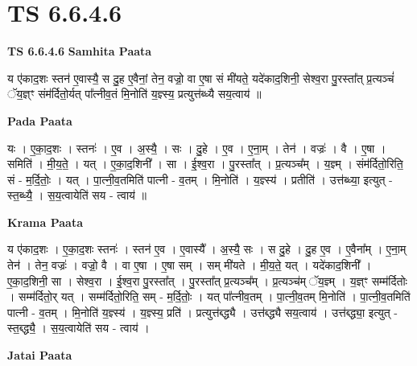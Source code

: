 \documentclass[17pt]{extarticle}
\begin{document}
\section{ TS 6.6.4.6 }

\textbf{TS 6.6.4.6 } \newline
\textbf{Samhita Paata} \newline

य ए॑काद॒शः स्तन॑ ए॒वास्यै॒ स दु॒ह ए॒वैनां॒ तेन॒ वज्रो॒ वा ए॒षा सं मी॑यते॒ यदे॑काद॒शिनी॒ सेश्व॒रा पु॒रस्ता᳚त् प्र॒त्यञ्चं॑ ॅय॒ज्ञ्ꣳ संम॑र्दितो॒र्यत् पा᳚त्नीव॒तं मि॒नोति॑ य॒ज्ञ्स्य॒ प्रत्युत्त॑ब्ध्यै सय॒त्वाय॑ ॥ \newline

\textbf{Pada Paata} \newline

यः । ए॒का॒द॒शः । स्तनः॑ । ए॒व । अ॒स्यै॒ । सः । दु॒हे । ए॒व । ए॒ना॒म् । तेन॑ । वज्रः॑ । वै । ए॒षा । समिति॑ । मी॒य॒ते॒ । यत् । ए॒का॒द॒शिनी᳚ । सा । ई॒श्व॒रा । पु॒रस्ता᳚त् । प्र॒त्यञ्च᳚म् । य॒ज्ञ्म् । संम॑र्दितो॒रिति॒ सं - म॒र्दि॒तोः॒ । यत् । पा॒त्नी॒व॒तमिति॑ पात्नी - व॒तम् । मि॒नोति॑ । य॒ज्ञ्स्य॑ । प्रतीति॑ । उत्त॑ब्ध्या॒ इत्युत् - स्त॒ब्ध्यै॒ । स॒य॒त्वायेति॑ सय - त्वाय॑ ॥  \newline


\textbf{Krama Paata} \newline

य ए॑काद॒शः । ए॒का॒द॒शः स्तनः॑ । स्तन॑ ए॒व । ए॒वास्यै᳚ । अ॒स्यै॒ सः । स दु॒हे । दु॒ह ए॒व । ए॒वैना᳚म् । ए॒ना॒म् तेन॑ । तेन॒ वज्रः॑ । वज्रो॒ वै । वा ए॒षा । ए॒षा सम् । सम् मी॑यते । मी॒य॒ते॒ यत् । यदे॑काद॒शिनी᳚ । ए॒का॒द॒शिनी॒ सा । सेश्व॒रा । ई॒श्व॒रा पु॒रस्ता᳚त् । पु॒रस्ता᳚त् प्र॒त्यञ्च᳚म् । प्र॒त्यञ्च॑म् ॅय॒ज्ञ्म् । य॒ज्ञ्ꣳ सम्म॑र्दितोः । सम्म॑र्दितो॒र् यत् । सम्म॑र्दितो॒रिति॒ सम् - म॒र्दि॒तोः॒ । यत् पा᳚त्नीव॒तम् । पा॒त्नी॒व॒तम् मि॒नोति॑ । पा॒त्नी॒व॒तमिति॑ पात्नी - व॒तम् । मि॒नोति॑ य॒ज्ञ्स्य॑ । य॒ज्ञ्स्य॒ प्रति॑ । प्रत्युत्त॑ब्द्ध्यै । उत्त॑ब्द्ध्यै सय॒त्वाय॑ । उत्त॑ब्द्ध्या॒ इत्युत् - स्त॒ब्द्ध्यै॒ । स॒य॒त्वायेति॑ सय - त्वाय॑ । \newline

\textbf{Jatai Paata} \newline
\end{document}
